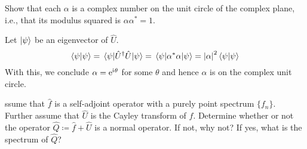 \documentclass[boxes,pages]{homework}
\makeatletter
\newcommand{\iu}{\mathrm{i}\mkern1mu}
\newcommand{\herm}[1]{{{#1}^\dagger}}
\newcommand{\e}{\mathrm{e}}
\numberwithin{@problem}{section}
\makeatother
\begin{document}
\begin{problem}
Show that each $\alpha$ is a complex number on the unit circle of the complex plane, i.e., that its modulus squared is $\alpha\alpha^* = 1$.
\end{problem}

\begin{solution}
	Let $\ket{\psi}$ be an eigenvector of $\hat{U}$.
	\begin{equation*}
		\braket{\psi}{\psi} = \ev{\herm{\hat{U}}\hat{U}}{\psi} = \ev{\alpha^*\alpha}{\psi} = \abs{\alpha}^2\braket{\psi}{\psi}
	\end{equation*}
	With this, we conclude $\alpha = \e^{\iu\theta}$ for some $\theta$ and hence $\alpha$ is on the complex unit circle.
\end{solution}

\begin{problem}
ssume that $\hat{f}$ is a self-adjoint operator with a purely point spectrum $\{f_n\}$. Further assume that $\hat{U}$ is the Cayley transform of $f$. Determine whether or not the operator $\hat{Q} \coloneqq \hat{f} + \hat{U}$ is a normal operator. If not, why not? If yes, what is the spectrum of $\hat{Q}$?
\end{problem}
\end{document}
